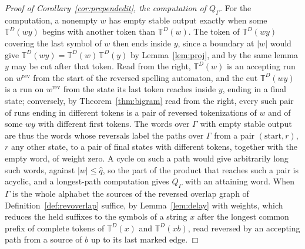 \documentclass[11pt,a4paper]{article}
\theoremstyle{definition}
\theoremstyle{plain}
\newcommand{\T}{\mathbb{T}}
\begin{document}
\begin{proof}[Proof of Corollary~\ref{cor:prependedit}, the computation of \(Q_\Gamma\)]
For the computation, a nonempty \(w\) has empty stable output exactly when some \(\T^D(wy)\) begins with another token
than \(\T^D(w)\). The token of \(\T^D(wy)\) covering the last symbol of \(w\) then ends inside \(y\), since a boundary
at \(|w|\) would give \(\T^D(wy) = \T^D(w)\,\T^D(y)\) by Lemma~\ref{lem:proj}, and by the same lemma \(y\) may be cut
after that token. Read from the right, \(\T^D(w)\) is an accepting run on \(w^{\mathrm{rev}}\) from the start of the
reversed spelling automaton, and the cut \(\T^D(wy)\) is a run on \(w^{\mathrm{rev}}\) from the state its last token
reaches inside \(y\), ending in a final state; conversely, by Theorem~\ref{thm:bigram} read from the right, every such
pair of runs ending in different tokens is a pair of reversed tokenizations of \(w\) and of some \(wy\) with different
first tokens. The words over \(\Gamma\) with empty stable output are thus the words whose reversals label the paths over
\(\Gamma\) from a pair \((\mathrm{start}, r)\), \(r\) any other state, to a pair of final states with different tokens,
together with the empty word, of weight zero. A cycle on such a path would give arbitrarily long such words, against
\(|w| \le \hat{q}\), so the part of the product that reaches such a pair is acyclic, and a longest-path computation
gives \(Q_\Gamma\) with an attaining word. When \(\Gamma\) is the whole alphabet the sources of the reversed overlap
graph of Definition~\ref{def:revoverlap} suffice, by Lemma~\ref{lem:delay} with weights, which reduces the held suffixes
to the symbols of a string \(x\) after the longest common prefix of complete tokens of \(\T^D(x)\) and \(\T^D(xb)\),
read reversed by an accepting path from a source of \(b\) up to its last marked edge.
\end{proof}

\end{document}
